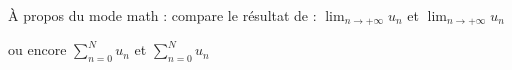 \documentclass[a4paper,11pt]{article} %
\newcommand{\ds}{\displaystyle} %
\begin{document}
~\\

\`A propos du mode math : compare le résultat de : $\lim_{n\to +\infty} u_n$ et $\displaystyle \lim_{n\to +\infty} u_n$

ou encore $\sum_{n=0}^{N} u_n$ et $\ds \sum_{n=0}^{N} u_n$
\end{document}

